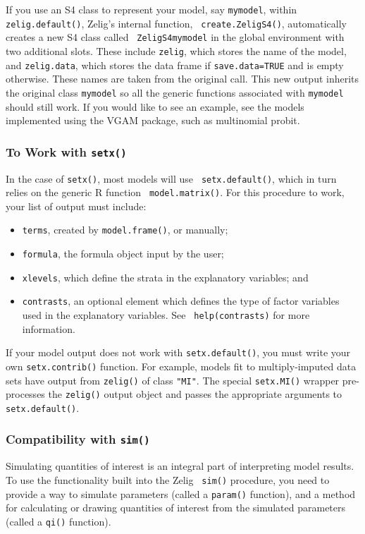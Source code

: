 If you use an S4 class to represent your model, say {\tt mymodel},
within {\tt zelig.default()}, Zelig's internal function, {\tt
  create.ZeligS4()}, automatically creates a new S4 class called {\tt
  ZeligS4mymodel} in the global environment with two additional slots.
These include {\tt zelig}, which stores the name of the model, and
{\tt zelig.data}, which stores the data frame if {\tt save.data=TRUE}
and is empty otherwise.  These names are taken from the original call.
This new output inherits the original class {\tt mymodel} so all the
generic functions associated with {\tt mymodel} should still work.  If
you would like to see an example, see the models implemented using the
VGAM package, such as multinomial probit.

\subsubsection{To Work with {\tt setx()}}

In the case of {\tt setx()}, most models will use {\tt
  setx.default()}, which in turn relies on the generic R function {\tt
  model.matrix()}.  For this procedure to work, your list of output
must include:  
\begin{itemize}
\item {\tt terms}, created by {\tt model.frame()}, or manually;
\item {\tt formula}, the formula object input by the user;
\item {\tt xlevels}, which define the strata in the explanatory
  variables; and
\item {\tt contrasts}, an optional element which defines the type of
  factor variables used in the explanatory variables.  See {\tt
    help(contrasts)} for more information.
\end{itemize}

If your model output does not work with {\tt setx.default()}, you must
write your own {\tt setx.contrib()} function.  For example, models fit
to multiply-imputed data sets have output from {\tt zelig()} of class
{\tt "MI"}.  The special {\tt setx.MI()} wrapper pre-processes the
{\tt zelig()} output object and passes the appropriate arguments to
{\tt setx.default()}.  

\subsubsection{Compatibility with {\tt sim()}}

Simulating quantities of interest is an integral part of interpreting
model results.  To use the functionality built into the Zelig {\tt
sim()} procedure, you need to provide a way to simulate parameters
(called a {\tt param()} function), and a method for calculating or
drawing quantities of interest from the simulated parameters (called a
{\tt qi()} function).

